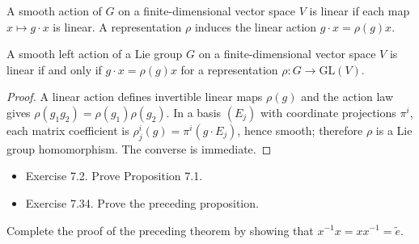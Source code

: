 \begin{definition}
\label{def:7-52-extra-2}




A smooth action of $G$ on a finite-dimensional vector space $V$ is linear if each map $x\mapsto g\cdot x$ is linear. A representation $\rho$ induces the linear action $g\cdot x=\rho(g)x$.
\end{definition}

\begin{proposition}
\label{prop:7-37}




A smooth left action of a Lie group $G$ on a finite-dimensional vector space $V$ is linear if and only if $g\cdot x=\rho(g)x$ for a representation $\rho:G\to\mathrm{GL}(V)$.
\end{proposition}

\begin{proof}

\sketch A linear action defines invertible linear maps $\rho(g)$ and the action law gives $\rho(g_1g_2)=\rho(g_1)\rho(g_2)$. In a basis $(E_j)$ with coordinate projections $\pi^i$, each matrix coefficient is $\rho^i_j(g)=\pi^i(g\cdot E_j)$, hence smooth; therefore $\rho$ is a Lie group homomorphism. The converse is immediate.
\end{proof}

\begin{exercise}
\label{exer:7-2}


\begin{itemize}
\item Exercise 7.2. Prove Proposition 7.1.
\end{itemize}
\end{exercise}

\begin{exercise}
\label{exer:7-34}


\begin{itemize}
\item Exercise 7.34. Prove the preceding proposition.
\end{itemize}
\end{exercise}

\begin{exercise}
\label{exer:7-8}


Complete the proof of the preceding theorem by showing that ${x}^{-1}x = x{x}^{-1} = \widetilde{e}.$
\end{exercise}
